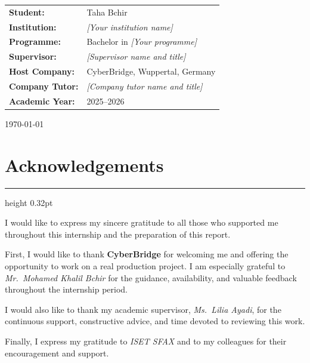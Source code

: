 \documentclass[12pt,a4paper]{report}
\newcommand{\sectionrule}{%
  \vspace{-1pt}%
  {\color{accentblue!22}\hrule height 0.32pt}%
  \vspace{5pt}%
}
\begin{document}
{\begin{titlepage}
    \vspace{0.9cm}
    \begin{flushleft}
      \renewcommand{\arraystretch}{1.3}
      \begin{tabular}{l l}
        \textbf{Student:}       & Taha Bchir \\
        \textbf{Institution:}   & \emph{[Your institution name]} \\
        \textbf{Programme:}     & Bachelor in \emph{[Your programme]} \\
        \textbf{Supervisor:}    & \emph{[Supervisor name and title]} \\
        \textbf{Host Company:}  & CyberBridge, Wuppertal, Germany \\
        \textbf{Company Tutor:} & \emph{[Company tutor name and title]} \\
        \textbf{Academic Year:} & 2025--2026 \\
      \end{tabular}
    \end{flushleft}
    \vfill
    {\large \today\par}
  \end{titlepage}
}

\setcounter{page}{1}
\pagestyle{frontmatter}

\chapter*{Acknowledgements}
{}
\sectionrule

I would like to express my sincere gratitude to all those who supported me throughout
this internship and the preparation of this report.

First, I would like to thank \textbf{CyberBridge} for welcoming me and offering the
opportunity to work on a real production project.
I am especially grateful to \emph{Mr.~Mohamed Khalil Bchir} for the guidance,
availability, and valuable feedback throughout the internship period.

I would also like to thank my academic supervisor, \emph{Ms.~Lilia Ayadi},
for the continuous support, constructive advice, and time devoted to reviewing this work.

Finally, I express my gratitude to \emph{ISET SFAX} and to my colleagues for their
encouragement and support.
\end{document}
